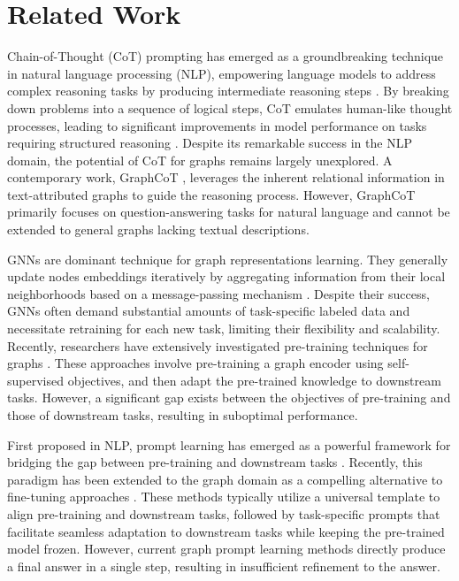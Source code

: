 \section{Related Work}
Chain-of-Thought (CoT) prompting has emerged as a groundbreaking technique in natural language processing (NLP), empowering language models to address complex reasoning tasks by producing intermediate reasoning steps \cite{wei2022chain,wang2023self,gao2023pal}. By breaking down problems into a sequence of logical steps, CoT emulates human-like thought processes, leading to significant improvements in model performance on tasks requiring structured reasoning \cite{yao2024tree,feng2024towards}. Despite its remarkable success in the NLP domain, the potential of CoT for graphs remains largely unexplored.  A contemporary work, GraphCoT \cite{jin2024graph}, leverages the inherent relational information in text-attributed graphs \cite{yan2023comprehensive,wen2023augmenting} to guide the reasoning process. However, GraphCoT primarily focuses on question-answering tasks for natural language and cannot be extended to general graphs lacking textual descriptions.

GNNs \cite{kipf2016semi, velivckovic2017graph} are dominant technique for graph representations learning. They generally update nodes embeddings iteratively by aggregating information from their local neighborhoods based on a message-passing mechanism \cite{xu2018powerful, hamilton2017inductive}. Despite their success, GNNs often demand substantial amounts of task-specific labeled data and necessitate retraining for each new task, limiting their flexibility and scalability.
Recently, researchers have extensively investigated pre-training techniques for graphs \cite{kipf2016variational, hu2020strategies, hu2020gpt, lu2021learning}. These approaches involve pre-training a graph encoder using self-supervised objectives, and then adapt the pre-trained knowledge to downstream tasks. However, a significant gap exists between the objectives of pre-training and those of downstream tasks, resulting in suboptimal performance. %


First proposed in NLP, prompt learning has emerged as a powerful framework for bridging the gap between pre-training and downstream tasks \cite{brown2020language,liu2021gpt,lester2021power}. Recently, this paradigm has been extended to the graph domain as a compelling alternative to fine-tuning approaches \cite{liu2023graphprompt,sun2022gppt,yu2023hgprompt,yu2024generalized}. These methods typically utilize a universal template to align pre-training and downstream tasks, followed by task-specific prompts that facilitate seamless adaptation to downstream tasks while keeping the pre-trained model frozen. However, current graph prompt learning methods directly produce a final answer in a single step, resulting in insufficient refinement to the answer.